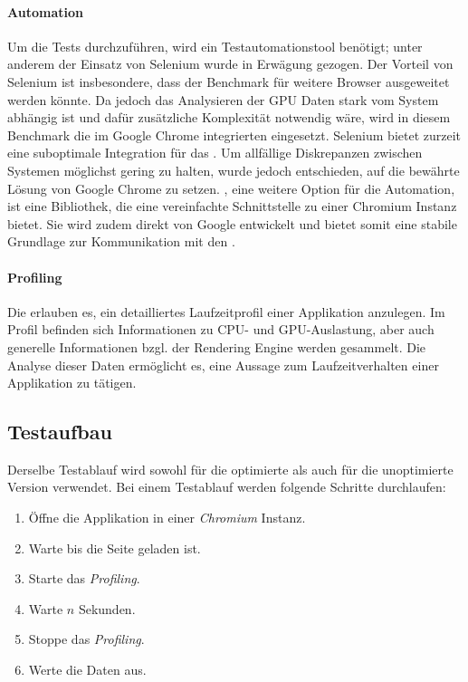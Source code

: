 \paragraph{Automation}
Um die Tests durchzuführen, wird ein Testautomationstool benötigt; unter anderem der Einsatz von Selenium wurde in Erwägung gezogen.
Der Vorteil von Selenium ist insbesondere, dass der Benchmark für weitere Browser ausgeweitet werden könnte.
Da jedoch das Analysieren der \gls{GPU} Daten stark vom System abhängig ist und dafür zusätzliche Komplexität notwendig wäre, wird in diesem Benchmark die im Google Chrome integrierten  eingesetzt.
Selenium bietet zurzeit eine suboptimale Integration für das .
Um allfällige Diskrepanzen zwischen Systemen möglichst gering zu halten, wurde jedoch entschieden, auf die bewährte Lösung von Google Chrome zu setzen.
, eine weitere Option für die Automation, ist eine Bibliothek, die eine vereinfachte Schnittstelle zu einer Chromium Instanz bietet.
Sie wird zudem direkt von Google entwickelt und bietet somit eine stabile Grundlage zur Kommunikation mit den .

\paragraph{Profiling}
Die  erlauben es, ein detailliertes Laufzeitprofil einer Applikation anzulegen.
Im Profil befinden sich Informationen zu \gls{CPU}- und \gls{GPU}-Auslastung, aber auch generelle Informationen bzgl. der \gls{Rendering Engine} werden gesammelt.
Die Analyse dieser Daten ermöglicht es, eine Aussage zum Laufzeitverhalten einer Applikation zu tätigen.

\subsection{Testaufbau}
Derselbe Testablauf wird sowohl für die optimierte als auch für die unoptimierte Version verwendet.
Bei einem Testablauf werden folgende Schritte durchlaufen:

\begin{enumerate}
  \item Öffne die Applikation in einer \emph{Chromium} Instanz.
  \item Warte bis die Seite geladen ist.
  \item Starte das \emph{Profiling}.
  \item Warte $n$ Sekunden.
  \item Stoppe das \emph{Profiling}.
  \item Werte die Daten aus.
\end{enumerate}

